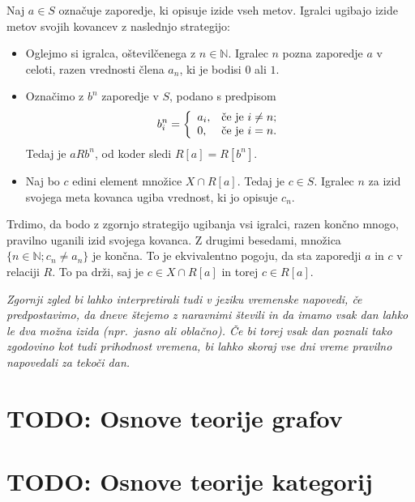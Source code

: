 \documentclass[11pt,paper=b5,footinclude,headinclude]{scrbook} %
\begin{document}
\medskip
Naj $a\in S$ označuje zaporedje, ki opisuje izide vseh metov.
Igralci ugibajo izide metov svojih kovancev z naslednjo strategijo:
  \begin{itemize}
 \item Oglejmo si igralca, oštevilčenega z $n\in \mathbb{N}$.
  Igralec $n$ pozna zaporedje $a$ v celoti, razen vrednosti člena $a_n$, ki je bodisi $0$ ali $1$.
  \item Označimo z $b^n$ zaporedje v $S$, podano s predpisom
  $$b^n_i = \left\{
               \begin{array}{ll}
                 a_i, & \hbox{\v ce je $i\neq n$;} \\
                 0, & \hbox{\v ce je $i = n$.}
               \end{array}
             \right.
  $$
  Tedaj je $aRb^n$, od koder sledi $R[a] = R[b^n]$.
  \item Naj bo $c$ edini element množice $X\cap R[a]$.
Tedaj je $c\in S$. Igralec $n$ za izid svojega meta kovanca ugiba vrednost, ki jo opisuje $c_n$.
\end{itemize}

\medskip
Trdimo, da bodo z zgornjo strategijo ugibanja vsi igralci, razen končno mnogo, pravilno uganili izid svojega kovanca.
Z drugimi besedami, množica $\{n\in \mathbb{N}; c_n\neq a_n\}$ je končna.
To je ekvivalentno pogoju, da sta zaporedji $a$ in $c$ v relaciji $R$. To pa drži, saj je $c\in X\cap R[a]$ in torej $c\in R[a]$.

\bigskip
\bigskip
\emph{ Zgornji zgled bi lahko interpretirali tudi v jeziku vremenske napovedi, če predpostavimo, da dneve štejemo z naravnimi števili in
da imamo vsak dan lahko le dva možna izida (npr.~jasno ali oblačno). Če bi torej vsak dan poznali tako zgodovino kot
tudi prihodnost vremena, bi lahko skoraj vse dni vreme pravilno napovedali za tekoči dan.}

\chapter{TODO: Osnove teorije grafov}

\chapter{TODO: Osnove teorije kategorij}
\end{document}

